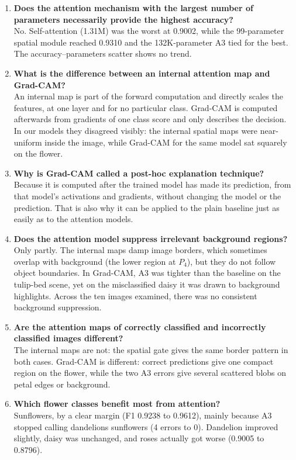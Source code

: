 \documentclass[10pt]{article}
\begin{document}
\begin{enumerate}
\item \textbf{Does the attention mechanism with the largest number of parameters necessarily provide the highest accuracy?}\\
No. Self-attention (1.31M) was the worst at 0.9002, while the 99-parameter
spatial module reached 0.9310 and the 132K-parameter A3 tied for the best. The
accuracy--parameters scatter shows no trend.

\item \textbf{What is the difference between an internal attention map and Grad-CAM?}\\
An internal map is part of the forward computation and directly scales the
features, at one layer and for no particular class. Grad-CAM is computed afterwards
from gradients of one class score and only describes the decision. In our models
they disagreed visibly: the internal spatial maps were near-uniform inside the
image, while Grad-CAM for the same model sat squarely on the flower.

\item \textbf{Why is Grad-CAM called a post-hoc explanation technique?}\\
Because it is computed after the trained model has made its prediction,
from that model's activations and gradients, without changing the model or the
prediction. That is also why it can be applied to the plain baseline just as
easily as to the attention models.

\item \textbf{Does the attention model suppress irrelevant background regions?}\\
Only partly. The internal maps damp image borders, which sometimes overlap
with background (the lower region at $P_4$), but they do not follow object
boundaries. In Grad-CAM, A3 was tighter than the baseline on the tulip-bed scene,
yet on the misclassified daisy it was drawn to background highlights. Across the
ten images examined, there was no consistent background suppression.

\item \textbf{Are the attention maps of correctly classified and incorrectly classified images different?}\\
The internal maps are not: the spatial gate gives the same border pattern
in both cases. Grad-CAM is different: correct predictions give one compact region
on the flower, while the two A3 errors give several scattered blobs on petal edges
or background.

\item \textbf{Which flower classes benefit most from attention?}\\
Sunflowers, by a clear margin (F1 0.9238 to 0.9612), mainly because A3
stopped calling dandelions sunflowers (4 errors to 0). Dandelion improved
slightly, daisy was unchanged, and roses actually got worse (0.9005 to 0.8796).


\end{enumerate}
\end{document}
